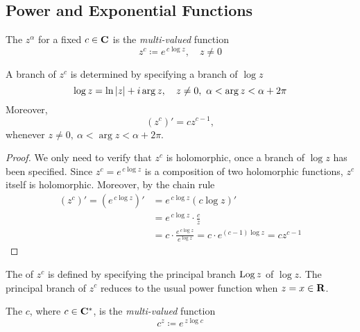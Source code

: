 \bigskip

\subsection{Power and Exponential Functions}
%
\begin{definition}
The  $z^\alpha$ for a fixed $c \in \mathbf C$ is the \emph{multi-valued} function
\[z^c \coloneqq e^{\,c\log z},\quad z \neq 0\]
\end{definition}

\medskip

\begin{proposition}[Branches of $z^c$]
A branch of $z^c$ is determined by specifying a branch of $\log z$
\[\log z = \ln\left\lvert z\right\rvert + i\arg z,\quad z \neq 0,\ \alpha < \arg z < \alpha + 2\pi\]
Moreover,
\[(z^c)' = c z^{c-1},\]
whenever $z \neq 0,\ \alpha < \arg z < \alpha + 2\pi$.
\end{proposition}
\begin{proof}
We only need to verify that $z^c$ is holomorphic, once a branch of $\log z$ has been specified. Since $z^c = e^{\,c\log z}$ is a composition of two holomorphic functions, $z^c$ itself is holomorphic. Moreover, by the chain rule
\begin{align*}
(z^c)' = (e^{\,c\log z})' &= e^{\,c\log z}(c\log z)'\\[0.5em]
&= e^{\,c\log z}\cdot \frac{c}{z}\\[0.5em]
&= c\cdot \frac{e^{\,c\log z}}{e^{\log z}} = c\cdot e^{(c-1)\log z} = cz^{c-1}
\end{align*}
\end{proof}

\medskip

\begin{discussion}
The  of $z^c$ is defined by specifying the principal branch $\operatorname{Log} z$ of $\log z$. The principal branch of $z^c$ reduces to the usual power function when $z =  x \in \mathbf R$.
\end{discussion}

\medskip

\begin{definition}
The  {\color{blue}$c$}, where $c\in \mathbf C^*$, is the \emph{multi-valued} function
\[c^z \coloneqq e^{\,z\log c}\]
\end{definition}

